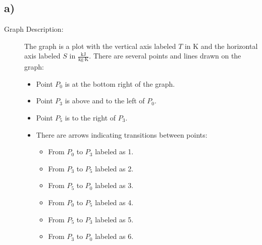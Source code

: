 

\subsection*{a)}

\begin{description}
    \item[Graph Description:] The graph is a plot with the vertical axis labeled $T \text{ in K}$ and the horizontal axis labeled $S \text{ in } \frac{\text{kJ}}{\text{kg} \cdot \text{K}}$. There are several points and lines drawn on the graph:
    \begin{itemize}
        \item Point $P_0$ is at the bottom right of the graph.
        \item Point $P_3$ is above and to the left of $P_0$.
        \item Point $P_5$ is to the right of $P_3$.
        \item There are arrows indicating transitions between points:
        \begin{itemize}
            \item From $P_0$ to $P_3$ labeled as 1.
            \item From $P_3$ to $P_5$ labeled as 2.
            \item From $P_5$ to $P_0$ labeled as 3.
            \item From $P_0$ to $P_5$ labeled as 4.
            \item From $P_5$ to $P_3$ labeled as 5.
            \item From $P_3$ to $P_0$ labeled as 6.
        \end{itemize}
    \end{itemize}
\end{description}
